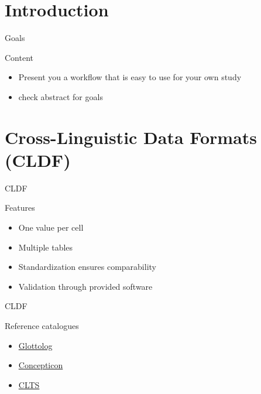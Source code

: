 \section{Introduction}
\begin{frame}{Goals}
    \begin{block}{Content}
        \begin{itemize}
            \item Present you a workflow that is easy to use for your own study
            \item check abstract for goals
        \end{itemize}
    \end{block}
\end{frame}


\section{Cross-Linguistic Data Formats (CLDF)}
\begin{frame}{CLDF}
    \begin{block}{Features}
        \begin{itemize}
            \item One value per cell
            \item Multiple tables
            \item Standardization ensures comparability
            \item Validation through provided software
        \end{itemize}
    \end{block}
\end{frame}




\begin{frame}{CLDF}
    \begin{block}{Reference catalogues}
        \begin{itemize}
            \item \href{https://glottolog.org/}{Glottolog}
            \item \href{https://concepticon.clld.org/}{Concepticon}
            \item \href{https://clts.clld.org/}{CLTS}
        \end{itemize}
    \end{block}
\end{frame}

